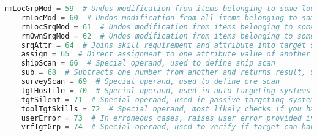 \begin{lstlisting}[language=python, caption=Dogma operands]
    rmLocGrpMod = 59  # Undos modification from items belonging to some location, filtered by group, format: ((location..groupFilter->targetAttribute).(operator)).RLGM(sourceAttribute)
    rmLocMod = 60  # Undos modification from all items belonging to some location, format: ((location->targetAttribute).(operator)).RLM(sourceAttribute)
    rmLocSrqMod = 61  # Undos modification from items belonging to some location, filtered by skill requirement, format: ((location[skillRequirement]->targetAttribute).(operator)).RLRSM(sourceAttribute)
    rmOwnSrqMod = 62  # Undos modification from items belonging to some location, filtered by owner of source, format: ((location[skillRequirement]->targetAttribute).(operator)).RORSM(sourceAttribute)
    srqAttr = 64  # Joins skill requirement and attribute into target definition, format: skillRequirement.targetAttribute
    assign = 65  # Direct assignment to one attribute value of another one
    shipScan = 66  # Special operand, used to define ship scan
    sub = 68  # Subtracts one number from another and returns result, used in conditions
    surveyScan = 69  # Special operand, used to define ore scan
    tgtHostile = 70  # Special operand, used in auto-targeting systems
    tgtSilent = 71  # Special operand, used in passive targeting systems
    toolTgtSkills = 72  # Special operand, most likely checks if you have enough skills to use currently loaded charge, or have enough skills to work with current target
    userError = 73  # In erroneous cases, raises user error provided in arg1
    vrfTgtGrp = 74  # Special operand, used to verify if target can have effect's carrier applied onto it, otherwise raises error
\end{lstlisting}